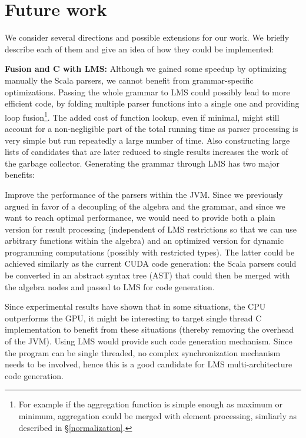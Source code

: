 \section{Future work}
We consider several directions and possible extensions for our work. We briefly describe each of them and give an idea of how they could be implemented:\ol

\item \textbf{Fusion and C with LMS:} Although we gained some speedup by optimizing manually the Scala parsers, we cannot benefit from grammar-specific optimizations. Passing the whole grammar to LMS could possibly lead to more efficient code, by folding multiple parser functions into a single one and providing loop fusion\footnote{For example if the aggregation function is simple enough as maximum or minimum, aggregation could be merged with element processing, simliarly as described in \S\ref{normalization}.}. The added cost of function lookup, even if minimal, might still account for a non-negligible part of the total running time as parser processing is very simple but run repeatedly a large number of time. Also constructing large lists of candidates that are later reduced to single results increases the work of the garbage collector. Generating the grammar through LMS has two major benefits:\ol
\item Improve the performance of the parsers within the JVM. Since we previously argued in favor of a decoupling of the algebra and the grammar, and since we want to reach optimal performance, we would need to provide both a plain version for result processing (independent of LMS restrictions so that we can use arbitrary functions within the algebra) and an optimized version for dynamic programming computations (possibly with restricted types). The latter could be achieved similarly as the current CUDA code generation: the Scala parsers could be converted in an abstract syntax tree (AST) that could then be merged with the algebra nodes and passed to LMS for code generation.
\item Since experimental results have shown that in some situations, the CPU outperforms the GPU, it might be interesting to target single thread C implementation to benefit from these situations (thereby removing the overhead of the JVM). Using LMS would provide such code generation mechanism. Since the program can be single threaded, no complex synchronization mechanism needs to be involved, hence this is a good candidate for LMS multi-architecture code generation. 

